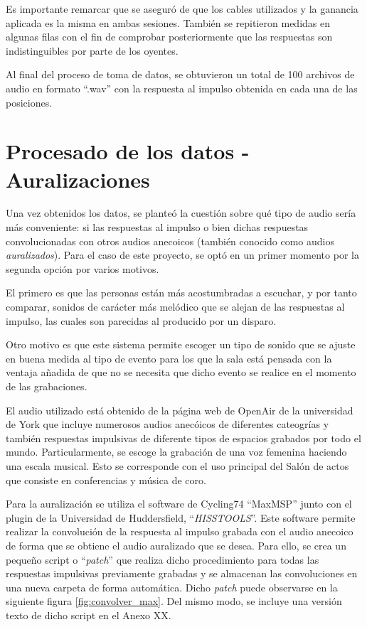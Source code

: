 \documentclass[11pt,a4paper,twoside]{book}
\begin{document}
            Es importante remarcar que se aseguró de que los cables utilizados y la ganancia aplicada es la misma en ambas sesiones. También se repitieron medidas en algunas filas con el fin de comprobar posteriormente que las respuestas son indistinguibles por parte de los oyentes.
        
            Al  final del proceso de toma de datos, se obtuvieron un total de 100 archivos de audio en formato ``.wav'' con la respuesta al impulso obtenida en cada una de las posiciones.
            
            \section{Procesado de los datos - Auralizaciones}
                Una vez obtenidos los datos, se planteó la cuestión sobre qué tipo de audio sería más conveniente: si las respuestas al impulso o bien dichas respuestas convolucionadas con otros audios anecoicos (también conocido como audios \textit{auralizados}). Para el caso de este proyecto, se optó en un primer momento por la segunda opción por varios motivos.
        
                El primero es que las personas están más acostumbradas a escuchar, y por tanto comparar, sonidos de carácter más melódico que se alejan de las respuestas al impulso, las cuales son parecidas al producido por un disparo.
        
                Otro motivo es que este sistema permite escoger un tipo de sonido que se ajuste en buena medida al tipo de evento para los que la sala está pensada con la ventaja añadida de que no se necesita que dicho evento se realice en el momento de las grabaciones.
        
                El audio utilizado está obtenido de la página web de OpenAir de la universidad de York que incluye numerosos audios anecóicos de diferentes cateogrías y también respuestas impulsivas de diferente tipos de espacios grabados por todo el mundo. Particularmente, se escoge la grabación de una voz femenina haciendo una escala musical. Esto se corresponde con el uso principal del Salón de actos que consiste en conferencias y música de coro.
        
                Para la auralización se utiliza el software de Cycling74 ``MaxMSP'' junto con el plugin de la Universidad de Huddersfield, ``\textit{HISSTOOLS}''. Este software permite realizar la convolución de la respuesta al impulso grabada con el audio anecoico de forma que se obtiene el audio auralizado que se desea. Para ello, se crea un pequeño script o ``\textit{patch}'' que realiza dicho procedimiento para todas las respuestas impulsivas previamente grabadas y se almacenan las convoluciones en una nueva carpeta de forma automática. Dicho \textit{patch} puede observarse en la siguiente figura \ref{fig:convolver_max}. Del mismo modo, se incluye una versión texto de dicho script en el Anexo XX.
                
\end{document}

